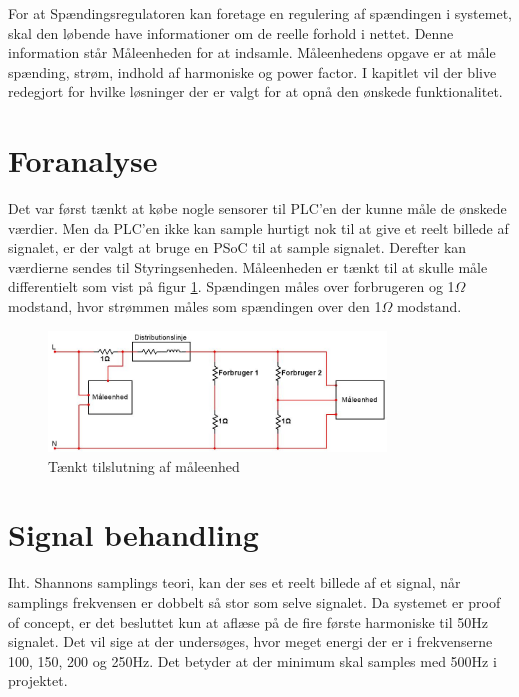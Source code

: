 
For at Spændingsregulatoren kan foretage en regulering af spændingen i systemet, skal den løbende have informationer om de reelle forhold i nettet. Denne information står Måleenheden for at indsamle. Måleenhedens opgave er at måle spænding, strøm, indhold af harmoniske og power factor. I kapitlet vil der blive redegjort for hvilke løsninger der er valgt for at opnå den ønskede funktionalitet. 

\section{Foranalyse}
Det var først tænkt at købe nogle sensorer til PLC'en der kunne måle de ønskede værdier. Men da PLC'en ikke kan sample hurtigt nok til at give et reelt billede af signalet, er der valgt at bruge en PSoC til at sample signalet. Derefter kan værdierne sendes til Styringsenheden. Måleenheden er tænkt til at skulle måle differentielt som vist på figur \ref{fig:MaalForanalyse}. Spændingen måles over forbrugeren og 1$\Omega$ modstand, hvor strømmen måles som spændingen over den 1$\Omega$ modstand.

\begin{figure}[H] %
	\centering
	\includegraphics[width=0.8\textwidth]{figure/MaalForanalyse}
	\caption{Tænkt tilslutning af måleenhed}
	\label{fig:MaalForanalyse}
\end{figure}

\section{Signal behandling}

Iht. Shannons samplings teori\cite{Shannon}, kan der ses et reelt billede af et signal, når samplings frekvensen er dobbelt så stor som selve signalet. Da systemet er proof of concept, er det besluttet kun at aflæse på de fire første harmoniske til 50Hz signalet. Det vil sige at der undersøges, hvor meget energi der er i frekvenserne 100, 150, 200 og 250Hz. Det betyder at der minimum skal samples med 500Hz i projektet.

